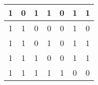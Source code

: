 \begin{tabular}{|c|c|c|c||c|c|c|}
  
  
  1 & 0 & 1 & 1
  
    
    
    & 0
  
    
    
    & 1
  
    
    
    & 1
   \\
  \hline

  
  
  1 & 1 & 0 & 0
  
    
    
    & 0
  
    
    
    & 1
  
    
    
    & 0
   \\
  

  
  
  1 & 1 & 0 & 1
  
    
    
    & 0
  
    
    
    & 1
  
    
    
    & 1
   \\
  

  
  
  1 & 1 & 1 & 0
  
    
    
    & 0
  
    
    
    & 1
  
    
    
    & 1
   \\
  

  
  
  1 & 1 & 1 & 1
  
    
    
    & 1
  
    
    
    & 0
  
    
    
    & 0
   \\
  \hline

\end{tabular}



